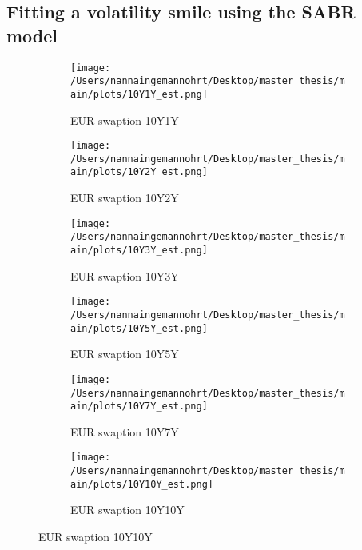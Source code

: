\subsection{Fitting a volatility smile using the SABR model}
\begin{figure}[htbp]
    \centering
    \begin{subfigure}{0.43\textwidth}
        \texttt{[image: /Users/nannaingemannohrt/Desktop/master\_thesis/main/plots/10Y1Y\_est.png]}
        \caption{EUR swaption 10Y1Y}
        \label{fig:10Y1Y_}
    \end{subfigure}\hfill
    \begin{subfigure}{0.43
        \textwidth}
        \texttt{[image: /Users/nannaingemannohrt/Desktop/master\_thesis/main/plots/10Y2Y\_est.png]}
        \caption{EUR swaption 10Y2Y}
        \label{fig:10Y2Y_}
    \end{subfigure}
    \begin{subfigure}{0.43\textwidth}
        \texttt{[image: /Users/nannaingemannohrt/Desktop/master\_thesis/main/plots/10Y3Y\_est.png]}
        \caption{EUR swaption 10Y3Y}
        \label{fig:10Y3Y_}
    \end{subfigure}\hfill
    \begin{subfigure}{0.43\textwidth}
        \texttt{[image: /Users/nannaingemannohrt/Desktop/master\_thesis/main/plots/10Y5Y\_est.png]}
        \caption{EUR swaption 10Y5Y}
        \label{fig:10Y5Y_}
    \end{subfigure}
    \begin{subfigure}{0.43\textwidth}
        \texttt{[image: /Users/nannaingemannohrt/Desktop/master\_thesis/main/plots/10Y7Y\_est.png]}
        \caption{EUR swaption 10Y7Y}
        \label{fig:10Y7Y_}
    \end{subfigure}\hfill
    \begin{subfigure}{0.43\textwidth}
        \texttt{[image: /Users/nannaingemannohrt/Desktop/master\_thesis/main/plots/10Y10Y\_est.png]}
        \caption{EUR swaption 10Y10Y}
        \label{fig:10Y10Y_}
    \end{subfigure}


\end{figure}
